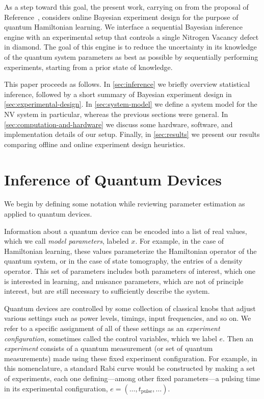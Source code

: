 \documentclass[aps,nofootinbib,twocolumn,superscriptaddress]{revtex4}
\newcommand{\mps}{x}
\newcommand{\eps}{e}
\begin{document}
As a step toward this goal, the present work, 
carrying on from the proposal of Reference~, 
considers online Bayesian experiment design for the purpose 
of quantum Hamiltonian learning.
We interface a sequential Bayesian inference engine with 
an experimental setup that controls a single Nitrogen
Vacancy defect in diamond.
The goal of this engine is to reduce the uncertainty 
in its knowledge of the quantum system parameters as best as 
possible by sequentially performing experiments, starting from 
a prior state of knowledge.

This paper proceeds as follows.
In \autoref{sec:inference} we briefly overview statistical 
inference, followed by a short summary of Bayesian experiment 
design in \autoref{sec:experimental-design}.
In \autoref{sec:system-model} we define a system model for 
the NV system in particular, whereas the previous sections 
were general.
In \autoref{sec:computation-and-hardware} we discuss some 
hardware, software, and implementation details of our setup.
Finally, in \autoref{sec:results} we present our results
comparing offline and online experiment design heuristics.



\section{Inference of Quantum Devices}
\label{sec:inference}

We begin by defining some notation while reviewing parameter 
estimation as applied to quantum devices.

Information about a quantum device can be encoded into a list of 
real values, which we call \textit{model parameters}, labeled $\mps$.
For example, in the case of Hamiltonian learning, 
these values parameterize the Hamiltonian operator of the 
quantum system, or in the case of 
state tomography, the entries of a density operator.
This set of parameters includes both parameters of interest, which 
one is interested in learning, and nuisance parameters, which are
not of principle interest, but are still necessary to sufficiently 
describe the system.

Quantum devices are controlled by some collection of 
classical knobs that adjust various settings 
such as power levels, timings, input frequencies, and so on.
We refer to a specific assignment of all of these settings as an
\textit{experiment configuration}, sometimes called the control
variables, which we label $\eps$.
Then an \textit{experiment}
consists of a quantum measurement (or set of quantum measurements) 
made using these fixed experiment configuration.
For example, in this nomenclature, a standard Rabi curve 
would be constructed by making a set of 
experiments, each one defining---among other fixed parameters---a 
pulsing time in its experimental configuration, 
$\eps=(\ldots,t_\text{pulse},\ldots)$.
\end{document}
